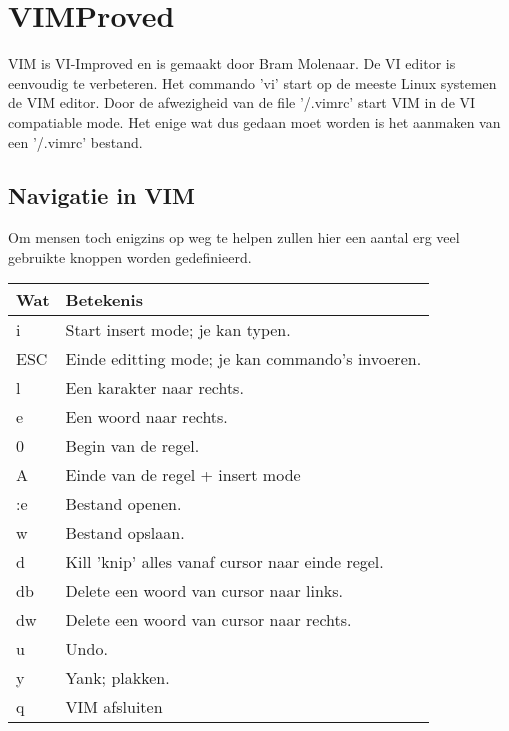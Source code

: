 %
%
%
%

\chapter{VIMProved}\label{app.vim}
VIM is VI-Improved en is gemaakt door Bram Molenaar. De VI editor is eenvoudig te verbeteren. Het commando 'vi' start op de meeste Linux systemen de VIM editor. Door de afwezigheid van de file '\customtilde/.vimrc' start VIM in de VI compatiable mode. Het enige wat dus gedaan moet worden is het aanmaken van een '\customtilde/.vimrc' bestand.

\section{Navigatie in VIM}
Om mensen toch enigzins op weg te helpen zullen hier een aantal erg veel gebruikte knoppen worden gedefinieerd.\\
\begin{tabular}[t]{ll}
  \hline
  Wat & Betekenis\\
  \hline
  i & Start insert mode; je kan typen.\\
  ESC & Einde editting mode; je kan commando's invoeren.\\
  l & Een karakter naar rechts\footnotemark.\\
  e & Een woord naar rechts\footnotemark.\\
  0 & Begin van de regel.\\
  A & Einde van de regel + insert mode\\
  :e & Bestand openen.\\
  w & Bestand opslaan.\\
  d & Kill 'knip' alles vanaf cursor naar einde regel.\\
  db & Delete een woord van cursor naar links.\\
  dw & Delete een woord van cursor naar rechts.\\
  u & Undo.\\
  y & Yank; plakken.\\
  q & VIM afsluiten\\
\end{tabular}
